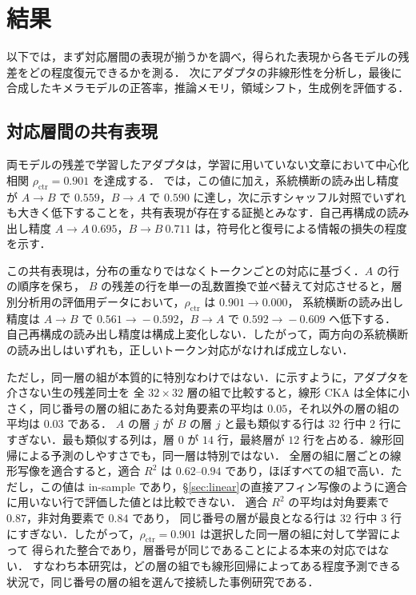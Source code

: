 \documentclass[techrep,noauthor]{ipsj}
\newcommand{\kw}[1]{#1}
\newcommand{\rev}[1]{{\color{blue}#1}}
\newcommand{\revr}[1]{{\color{red}#1}}
\newcommand{\revp}[1]{{\color{violet}#1}}
\begin{document}
\section{結果}\label{sec:results}
以下では，まず対応層間の表現が揃うかを調べ，得られた表現から各モデルの残差をどの程度復元できるかを測る．
次にアダプタの非線形性を分析し，最後に合成したキメラモデルの\revr{正答率，推論メモリ，領域シフト，生成例}を評価する．

\subsection{対応層間の\revr{共有表現}}\label{sec:space}
\revr{両モデルの残差で学習したアダプタは，学習に用いていない文章において中心化相関 $\rho_{\mathrm{ctr}}\!=\!0.901$ を達成する．
\revp{\rev{本稿}では，この値に加え，系統横断の読み出し精度が $A\!\to\!B$ で $0.559$，$B\!\to\!A$ で $0.590$ に達し，次に示すシャッフル対照でいずれも大きく低下することを，共有表現が存在する証拠とみなす．自己再構成の読み出し精度 $A\!\to\!A\ 0.695$，$B\!\to\!B\ 0.711$ は，符号化と復号による情報の損失の程度を示す．}

\rev{この共有表現}は，分布の重なりではなくトークンごとの対応に基づく．$A$ の行の順序を保ち，
$B$ の残差の行を単一の乱数置換で並べ替えて対応させると，層別分析用の評価用データにおいて，$\rho_{\mathrm{ctr}}$ は $0.901\!\to\!0.000$，
系統横断の読み出し精度は $A\!\to\!B$ で $0.561\!\to\!-0.592$，$B\!\to\!A$ で $0.592\!\to\!-0.609$ へ低下する．
自己再構成の読み出し精度は構成上変化しない．したがって，両方向の系統横断の読み出しはいずれも，正しいトークン対応がなければ成立しない．}

ただし，\kw{同一層の組が本質的に特別なわけではない}．に示すように，アダプタを介さない生の残差同士を
全 $32{\times}32$ 層の組で比較すると，線形 CKA は全体に小さく，\revr{同じ番号の層の組にあたる}対角要素の平均は $0.05$，\revp{それ以外の層の組}の平均は $0.03$ である．
$A$ の層 $j$ が $B$ の層 $j$ と最も類似する行は $32$ 行中 $2$ 行にすぎない．最も類似する列は，層 $0$ が $14$ 行，最終層が
$12$ 行を占める．線形回帰による予測のしやすさでも，同一層は特別ではない．
全層の組に層ごとの線形写像を適合すると，適合 $R^2$ は $0.62$--$0.94$ であり，ほぼすべての組で高い．\revr{ただし，この値は in-sample であり，\S\ref{sec:linear}の直接アフィン写像のように適合に用いない行で評価した値とは比較できない．}
適合 $R^2$ の平均は対角要素で $0.87$，非対角要素で $0.84$ であり，
同じ番号の層が最良となる行は $32$ 行中 $3$ 行にすぎない．したがって，$\rho_{\mathrm{ctr}}\!=\!0.901$ は選択した同一層の組に対して学習によって
得られた整合であり，\rev{層番号が同じであることによる本来の対応ではない．
すなわち本研究は，どの層の組でも線形回帰によってある程度予測できる状況で，同じ番号の層の組を選んで接続した事例研究である．}
\end{document}
